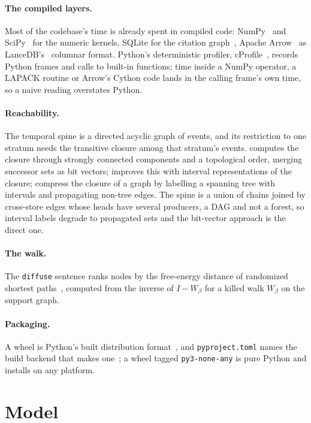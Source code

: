 \documentclass[11pt]{article}
\theoremstyle{plain}
\theoremstyle{definition}
\theoremstyle{remark}
\begin{document}
\paragraph{The compiled layers.} Most of the codebase's time is already spent in compiled code:
NumPy~\cite{harris2020} and SciPy~\cite{virtanen2020} for the numeric kernels, SQLite for the
citation graph~\cite{gaffney2022}, Apache Arrow~\cite{arrow} as LanceDB's~\cite{lancedb} columnar
format. Python's deterministic profiler, cProfile~\cite{pyprofile}, records Python frames and calls
to built-in functions; time inside a NumPy operator, a LAPACK routine or Arrow's Cython code lands
in the calling frame's own time, so a naive reading overstates Python.

\paragraph{Reachability.} The temporal spine is a directed acyclic graph of events, and its
restriction to one stratum needs the transitive closure among that stratum's events.
\citet{purdom1970} computes the closure through strongly connected components and a topological
order, merging successor sets as bit vectors; \citet{nuutila1995} improves this with interval
representations of the closure; \citet{agrawal1989} compress the closure of a graph by labelling a
spanning tree with intervals and propagating non-tree edges. The spine is a union of chains joined
by cross-store edges whose heads have several producers, a DAG and not a forest, so interval labels
degrade to propagated sets and the bit-vector approach is the direct one.

\paragraph{The walk.} The \texttt{diffuse} sentence ranks nodes by the free-energy distance of
randomized shortest paths~\cite{kivimaki2014}, computed from the inverse of $I - W_\beta$ for a
killed walk $W_\beta$ on the support graph.

\paragraph{Packaging.} A wheel is Python's built distribution format~\cite{pep427}, and
\texttt{pyproject.toml} names the build backend that makes one~\cite{pep517}; a wheel tagged
\texttt{py3-none-any} is pure Python and installs on any platform.

\section{Model}\label{sec:model}
\end{document}
